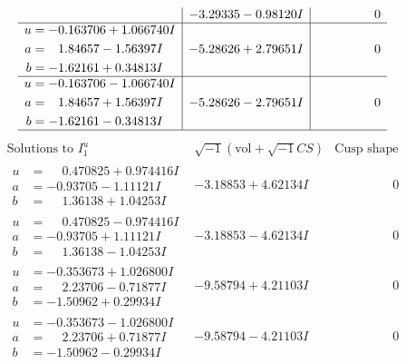 \documentclass[1p]{elsarticle_modified}
\theoremstyle{definition}
\newcommand{\I}{\sqrt{-1}}
\begin{document}
$$\begin{array}{c|c|c}
 & -3.29335 - 0.98120 I & \phantom{-0.000000 } 0 \\ \hline\begin{aligned}
u &= -0.163706 + 1.066740 I \\
a &= \phantom{-}1.84657 - 1.56397 I \\
b &= -1.62161 + 0.34813 I\end{aligned}
 & -5.28626 + 2.79651 I & \phantom{-0.000000 } 0 \\ \hline\begin{aligned}
u &= -0.163706 - 1.066740 I \\
a &= \phantom{-}1.84657 + 1.56397 I \\
b &= -1.62161 - 0.34813 I\end{aligned}
 & -5.28626 - 2.79651 I & \phantom{-0.000000 } 0\\
 \hline 
 \end{array}$$\newpage$$\begin{array}{c|c|c}  
\text{Solutions to }I^u_{1}& \I (\text{vol} + \sqrt{-1}CS) & \text{Cusp shape}\\
 \hline 
\begin{aligned}
u &= \phantom{-}0.470825 + 0.974416 I \\
a &= -0.93705 - 1.11121 I \\
b &= \phantom{-}1.36138 + 1.04253 I\end{aligned}
 & -3.18853 + 4.62134 I & \phantom{-0.000000 } 0 \\ \hline\begin{aligned}
u &= \phantom{-}0.470825 - 0.974416 I \\
a &= -0.93705 + 1.11121 I \\
b &= \phantom{-}1.36138 - 1.04253 I\end{aligned}
 & -3.18853 - 4.62134 I & \phantom{-0.000000 } 0 \\ \hline\begin{aligned}
u &= -0.353673 + 1.026800 I \\
a &= \phantom{-}2.23706 - 0.71877 I \\
b &= -1.50962 + 0.29934 I\end{aligned}
 & -9.58794 + 4.21103 I & \phantom{-0.000000 } 0 \\ \hline\begin{aligned}
u &= -0.353673 - 1.026800 I \\
a &= \phantom{-}2.23706 + 0.71877 I \\
b &= -1.50962 - 0.29934 I\end{aligned}
 & -9.58794 - 4.21103 I & \phantom{-0.000000 } 0 \\ \hline\begin{aligned}

\end{aligned}
\end{array}$$
\end{document}
